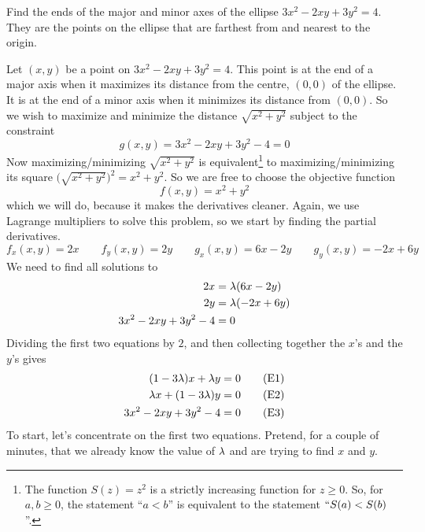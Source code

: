 \begin{eg}\label{eg LagrangeC}
Find the ends of the major and minor axes of the ellipse 
$3x^2-2xy+3y^2=4$. They are the points on the ellipse that are farthest
from and nearest to the origin.

\soln 
 Let $(x,y)$ be a point on $3x^2-2xy+3y^2=4$. This point is at
the end of a major axis when it maximizes its distance from the centre,
$(0,0)$ of the ellipse. It is at the end of a minor axis when it minimizes 
its distance from $(0,0)$. So we wish to maximize and minimize the 
distance $\sqrt{x^2+y^2}$ subject to the constraint 
\begin{equation*}
g(x,y)=3x^2-2xy+3y^2-4=0
\end{equation*}
Now maximizing/minimizing $\sqrt{x^2+y^2}$
is equivalent\footnote{The function $S(z)=z^2$ is a strictly increasing function for $z\ge 0$. So, for $a,b\ge 0$, the statement ``$a<b$''
is equivalent to the statement $``S(a)<S(b)$''.} to maximizing/minimizing 
its square $\big(\sqrt{x^2+y^2}\big)^2=x^2+y^2$.
So we are free to choose the objective function 
\begin{equation*}
f(x,y)=x^2+y^2
\end{equation*}
which we will do, because it makes the derivatives cleaner. 
Again, we use Lagrange multipliers to solve this problem, so we start
by finding the partial derivatives.  
\begin{equation*}
f_x(x,y)=2x\qquad f_y(x,y)=2y \qquad
g_x(x,y)=6x-2y\qquad g_y(x,y)=-2x+6y
\end{equation*}
We need to find all solutions to
\begin{align*}
2x&=\lambda (6x-2y) \\
2y&=\lambda (-2x+6y) \\
3x^2-2xy+3y^2-4&=0  
\end{align*}
Dividing the first two equations by $2$, and
then collecting together the $x$'s and the $y$'s gives
\begin{align*} 
       (1-3\lambda)x+\lambda y&=0  \tag{E1}\\
       \lambda x+(1-3\lambda)y&=0  \tag{E2}\\
    3x^2-2xy+3y^2-4&=0  \tag{E3}
\end{align*}
To start, let's concentrate on the first two equations. Pretend, for a couple
of minutes, that we already know the value of $\lambda$ and are trying to find
$x$ and $y$. 
\end{eg}
